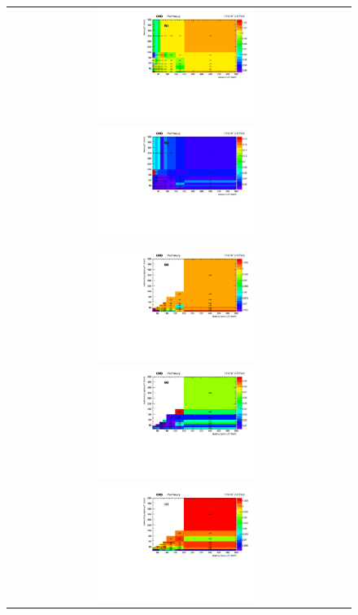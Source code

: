 {\begin{figure}[h]
  \begin{center}
    \begin{tabular}{cc}
      \includegraphics[width=0.50\textwidth]{fig_2016postVFP_TrigSF/h2D_lepABpt_emu.pdf}
      \includegraphics[width=0.50\textwidth]{fig_2016postVFP_TrigSF/h2D_lepABpt_emu_BinErrors.pdf}\\       
      \includegraphics[width=0.50\textwidth]{fig_2016postVFP_TrigSF/h2D_lepABpt_ee.pdf}
      \includegraphics[width=0.50\textwidth]{fig_2016postVFP_TrigSF/h2D_lepABpt_ee_BinErrors.pdf}\\
      \includegraphics[width=0.50\textwidth]{fig_2016postVFP_TrigSF/h2D_lepABpt_mumu.pdf}

\end{tabular}
\end{center}
\end{figure}}
